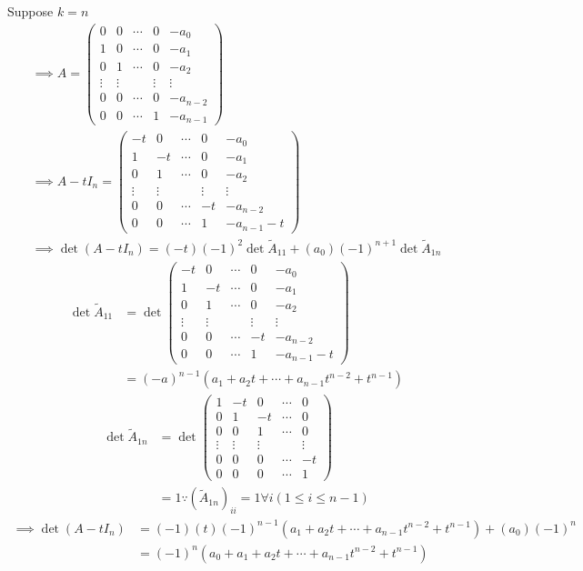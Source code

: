 Suppose $k=n$
\begin{gather}
\implies A =
\begin{pmatrix}
0 & 0 & \cdots & 0 & -a_0\\
1 & 0 & \cdots & 0 & -a_1\\
0 & 1 & \cdots & 0 & -a_2\\
\vdots& \vdots & & \vdots & \vdots\\
0 & 0 & \cdots & 0 & -a_{n-2}\\
0 & 0 & \cdots & 1 & -a_{n-1}
\end{pmatrix}\\
\implies A - tI_n =
\begin{pmatrix}
-t & 0 & \cdots & 0 & -a_0\\
1 & -t & \cdots & 0 & -a_1\\
0 & 1 & \cdots & 0 & -a_2\\
\vdots& \vdots & & \vdots & \vdots\\
0 & 0 & \cdots & -t & -a_{n-2}\\
0 & 0 & \cdots & 1 & -a_{n-1} -t
\end{pmatrix}\\
\implies \det{(A-tI_n)} = (-t)(-1)^2\det{\tilde{A}_{11}} +
(a_0)(-1)^{n+1}\det{\tilde{A}_{1n}}
\end{gather}
\begin{align}
\det{\tilde{A}_{11}} &= \det{\begin{pmatrix}
-t & 0 & \cdots & 0 & -a_0\\
1 & -t & \cdots & 0 & -a_1\\
0 & 1 & \cdots & 0 & -a_2\\
\vdots& \vdots & & \vdots & \vdots\\
0 & 0 & \cdots & -t & -a_{n-2}\\
0 & 0 & \cdots & 1 & -a_{n-1} -t
  \end{pmatrix}}\\
&= (-a)^{n-1}(a_1 +a_2 t + \dotsb + a_{n-1}t^{n-2} + t^{n-1}) 
\end{align}
\begin{align}
\det{\tilde{A}_{1n}} &= \det{\begin{pmatrix}
1 & -t & 0 & \cdots & 0 \\
0 & 1 & -t & \cdots & 0  \\
0 & 0 & 1 & \cdots & 0  \\
\vdots & \vdots& \vdots & & \vdots \\
0 & 0 & 0 & \cdots & -t \\
0 & 0 & 0 & \cdots & 1 
    \end{pmatrix}}\\
&= 1 \because (\tilde{A}_{1n})_{ii} =1 \forall i (1\leq i \leq n-1)
\end{align}
\begin{align}
\implies \det{(A-tI_n)} &= (-1)(t)(-1)^{n-1}(a_1 +a_2 t + \dotsb +
a_{n-1}t^{n-2} + t^{n-1}) + (a_0)(-1)^n\\
&= (-1)^n(a_0 + a_1 +a_2 t + \dotsb + a_{n-1}t^{n-2} + t^{n-1})
\end{align}
